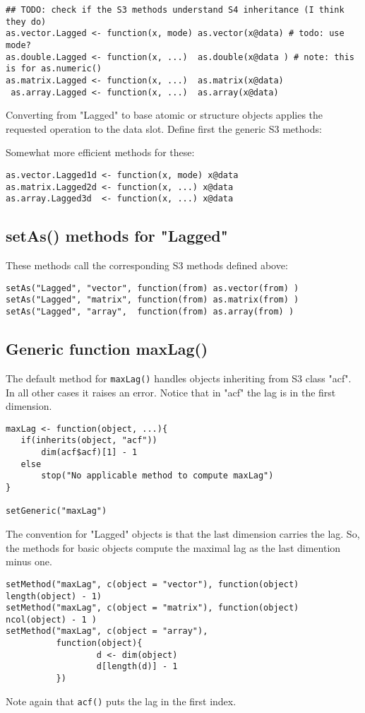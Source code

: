 \documentclass[11pt,a4paper]{article}
\begin{document}
\begin{verbatim}
## TODO: check if the S3 methods understand S4 inheritance (I think they do)
as.vector.Lagged <- function(x, mode) as.vector(x@data) # todo: use mode?
as.double.Lagged <- function(x, ...)  as.double(x@data ) # note: this is for as.numeric()
as.matrix.Lagged <- function(x, ...)  as.matrix(x@data)
 as.array.Lagged <- function(x, ...)  as.array(x@data)
\end{verbatim}
Converting from "Lagged" to base atomic or structure objects applies the requested
operation to the data slot. Define first the generic S3 methods:

Somewhat more efficient methods for these:
\begin{verbatim}
as.vector.Lagged1d <- function(x, mode) x@data
as.matrix.Lagged2d <- function(x, ...) x@data
as.array.Lagged3d  <- function(x, ...) x@data
\end{verbatim}


\subsection{setAs() methods for "Lagged"}
\label{sec:orgb0cb9c9}

These methods call the corresponding S3 methods defined above:
\begin{verbatim}
setAs("Lagged", "vector", function(from) as.vector(from) )
setAs("Lagged", "matrix", function(from) as.matrix(from) )
setAs("Lagged", "array",  function(from) as.array(from) )
\end{verbatim}



\subsection{Generic function maxLag()}
\label{sec:org7900752}

The default method for \texttt{maxLag()} handles objects inheriting from S3 class "acf". In all
other cases it raises an error. Notice that in "acf" the lag is in the first dimension.
\begin{verbatim}
maxLag <- function(object, ...){
   if(inherits(object, "acf"))
       dim(acf$acf)[1] - 1
   else
       stop("No applicable method to compute maxLag")
}

setGeneric("maxLag")
\end{verbatim}

The convention for "Lagged" objects is that the last dimension carries the lag.  So, the
methods for basic objects compute the maximal lag as the last dimention minus one.
\begin{verbatim}
setMethod("maxLag", c(object = "vector"), function(object) length(object) - 1)
setMethod("maxLag", c(object = "matrix"), function(object) ncol(object) - 1 )
setMethod("maxLag", c(object = "array"),
          function(object){
                  d <- dim(object)
                  d[length(d)] - 1
          })
\end{verbatim}
Note again that \texttt{acf()} puts the lag in the first index.
\end{document}
